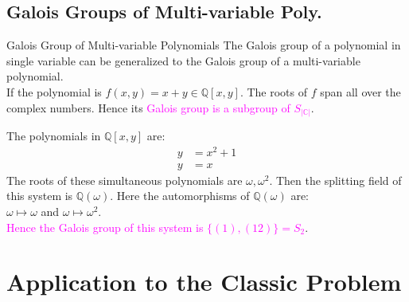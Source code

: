 \documentclass{beamer}
\begin{document}
\subsection{Galois Groups of Multi-variable Poly.}
\begin{frame}{Galois Group of Multi-variable Polynomials}
  The Galois group of a polynomial in single variable can be generalized to the Galois group of a multi-variable polynomial.\\[3mm]
If the polynomial is \textcolor{green!50!black}{\(f(x,y)=x+y \in \mathbb{Q}[x,y]\)}. The roots of \(f\) span all over the complex numbers. Hence its \textcolor{magenta}{Galois group is a subgroup of  \(S_{|\mathbb{C}|}\)}.


\vspace{2mm}
 \begin{tcolorbox}[colback=white, colframe=brown!80!black, boxsep=1mm, title={\bfseries \color{white} Example}]
  The polynomials in \(\mathbb{Q}[x,y]\) are: \begin{align}
                         y &= x^2+1 \\
                         y&=x
                       \end{align}
                       The roots of these simultaneous polynomials are \(\omega, {\omega}^2\). Then the splitting field of this system is \(\mathbb{Q}(\omega)\). Here the automorphisms of \(\mathbb{Q}(\omega)\) are: \\
       \(\omega \longmapsto \omega\) and \hspace{9mm} \(\omega \longmapsto {\omega}^2\).\\
                       \textcolor{magenta}{Hence the Galois group of this system is \(\{(1), (12)\} = S_2\)}.
\end{tcolorbox}
\end{frame}

\section{Application to the Classic Problem}
\end{document}
